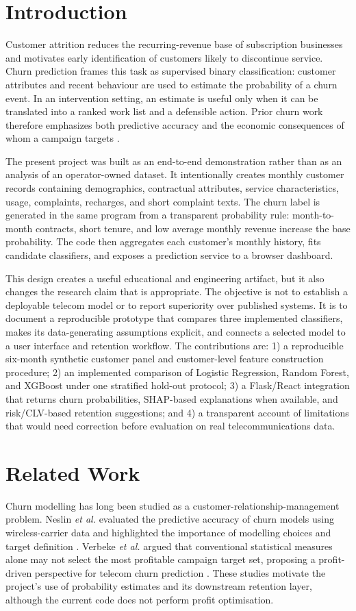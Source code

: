 \documentclass[conference]{IEEEtran}
\begin{document}
\section{Introduction}
Customer attrition reduces the recurring-revenue base of subscription businesses and motivates early identification of customers likely to discontinue service. Churn prediction frames this task as supervised binary classification: customer attributes and recent behaviour are used to estimate the probability of a churn event. In an intervention setting, an estimate is useful only when it can be translated into a ranked work list and a defensible action. Prior churn work therefore emphasizes both predictive accuracy and the economic consequences of whom a campaign targets \cite{verbeke}.

The present project was built as an end-to-end demonstration rather than as an analysis of an operator-owned dataset. It intentionally creates monthly customer records containing demographics, contractual attributes, service characteristics, usage, complaints, recharges, and short complaint texts. The churn label is generated in the same program from a transparent probability rule: month-to-month contracts, short tenure, and low average monthly revenue increase the base probability. The code then aggregates each customer's monthly history, fits candidate classifiers, and exposes a prediction service to a browser dashboard.

This design creates a useful educational and engineering artifact, but it also changes the research claim that is appropriate. The objective is not to establish a deployable telecom model or to report superiority over published systems. It is to document a reproducible prototype that compares three implemented classifiers, makes its data-generating assumptions explicit, and connects a selected model to a user interface and retention workflow. The contributions are: 1) a reproducible six-month synthetic customer panel and customer-level feature construction procedure; 2) an implemented comparison of Logistic Regression, Random Forest, and XGBoost under one stratified hold-out protocol; 3) a Flask/React integration that returns churn probabilities, SHAP-based explanations when available, and risk/CLV-based retention suggestions; and 4) a transparent account of limitations that would need correction before evaluation on real telecommunications data.

\section{Related Work}
Churn modelling has long been studied as a customer-relationship-management problem. Neslin \emph{et al.} evaluated the predictive accuracy of churn models using wireless-carrier data and highlighted the importance of modelling choices and target definition \cite{neslin}. Verbeke \emph{et al.} argued that conventional statistical measures alone may not select the most profitable campaign target set, proposing a profit-driven perspective for telecom churn prediction \cite{verbeke}. These studies motivate the project's use of probability estimates and its downstream retention layer, although the current code does not perform profit optimisation.
\end{document}
